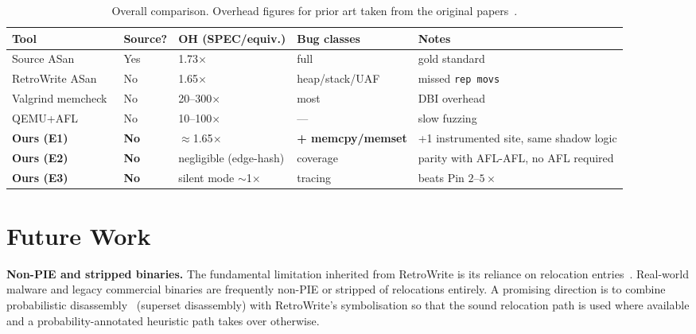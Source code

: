 \documentclass[10pt,a4paper]{article}
\begin{document}
\begin{table}[H]
\centering
\caption{Overall comparison. Overhead figures for prior art taken from the
original papers~\cite{asan,retrowrite,valgrind,qemu}.}
\label{tab:overall}
\footnotesize
\begin{tabular}{p{3.7cm}p{1.8cm}p{2cm}p{2.2cm}p{3.8cm}}
\toprule
\textbf{Tool} & \textbf{Source?} & \textbf{OH (SPEC/equiv.)} & \textbf{Bug classes} & \textbf{Notes} \\
\midrule
\rowcolor{rowgray} Source ASan~\cite{asan} & Yes & 1.73$\times$ & full & gold standard \\
RetroWrite ASan~\cite{retrowrite} & No & 1.65$\times$ & heap/stack/UAF & missed \texttt{rep movs} \\
\rowcolor{rowgray} Valgrind memcheck~\cite{valgrind} & No & 20--300$\times$ & most & DBI overhead \\
QEMU+AFL~\cite{qemu} & No & 10--100$\times$ & --- & slow fuzzing \\
\rowcolor{accent!15} \textbf{Ours (E1)} & \textbf{No} & $\approx$1.65$\times$ & \textbf{+ memcpy/memset} & +1 instrumented site, same shadow logic \\
\rowcolor{accent!15} \textbf{Ours (E2)} & \textbf{No} & negligible (edge-hash) & coverage & parity with AFL-AFL, no AFL required \\
\rowcolor{accent!15} \textbf{Ours (E3)} & \textbf{No} & silent mode $\sim$1$\times$ & tracing & beats Pin $2$--$5\times$~\cite{pin} \\
\bottomrule
\end{tabular}
\end{table}

\section{Future Work}

\textbf{Non-PIE and stripped binaries.} The fundamental limitation inherited
from RetroWrite is its reliance on relocation
entries~\cite{retrowrite}. Real-world malware and legacy commercial binaries
are frequently non-PIE or stripped of relocations entirely. A promising
direction is to combine probabilistic disassembly~\cite{probabilistic}
(superset disassembly) with RetroWrite's symbolisation so that the sound
relocation path is used where available and a probability-annotated
heuristic path takes over otherwise.
\end{document}

